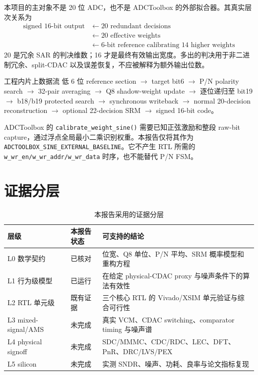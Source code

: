 \documentclass[UTF8,fontset=none,a4paper,11pt,openany]{ctexrep}
\begin{document}
本项目的主对象不是 20 位 ADC，也不是 ADCToolbox 的外部拟合器。其真实层次关系为
\begin{equation}
\boxed{\begin{aligned}
\text{signed 16-bit output}
&\leftarrow 20\text{ redundant decisions}\\
&\leftarrow 20\text{ effective weights}\\
&\leftarrow 6\text{-bit reference calibrating 14 higher weights}
\end{aligned}}
\end{equation}
20 是冗余 SAR 的判决维数；16 才是最终有效输出宽度。多出的判决用于非二进制冗余、split-CDAC 以及误差恢复，不应被解释为额外输出位数。

\begin{methodbox}{工程内片上数据流}
低 6 位 reference section $\rightarrow$ target bit6 $\rightarrow$ P/N polarity search $\rightarrow$ 32-pair averaging $\rightarrow$ Q8 shadow-weight update $\rightarrow$ 逐位递归至 bit19 $\rightarrow$ b18/b19 protected search $\rightarrow$ synchronous writeback $\rightarrow$ normal 20-decision reconstruction $\rightarrow$ optional 22-decision SRM $\rightarrow$ signed 16-bit code。
\end{methodbox}

ADCToolbox 的 \texttt{calibrate\_weight\_sine()} 需要已知正弦激励和整段 raw-bit capture，通过浮点全局最小二乘识别权重。本报告仅将其作为 \texttt{ADCTOOLBOX\_SINE\_EXTERNAL\_BASELINE}。它不产生 RTL 所需的 \texttt{w\_wr\_en/w\_wr\_addr/w\_wr\_data} 时序，也不能替代 P/N FSM。

\section{证据分层}

\begin{table}[H]
\centering
\caption{本报告采用的证据分层}
\label{tab:evidence-levels}
\begin{tabularx}{\textwidth}{p{}p{}X}
\toprule
层级 & 本报告状态 & 可支持的结论\\
\midrule
L0 数学契约 & 已核对 & 位宽、Q8 单位、P/N 平均、SRM 概率模型和重构方程\\
L1 行为级模型 & 已运行 & 在给定 physical-CDAC proxy 与噪声条件下的算法有效性\\
L2 RTL 单元级 & 既有证据 & 三个核心 RTL 的 Vivado/XSIM 单元验证与综合可行性\\
L3 mixed-signal/AMS & 未完成 & 真实 VCM、CDAC switching、comparator timing 与噪声谱\\
L4 physical signoff & 未完成 & SDC/MMMC、CDC/RDC、LEC、DFT、PnR、DRC/LVS/PEX\\
L5 silicon & 未完成 & 实测 SNDR、噪声、功耗、良率与论文指标复现\\
\bottomrule
\end{tabularx}
\end{table}
\end{document}
